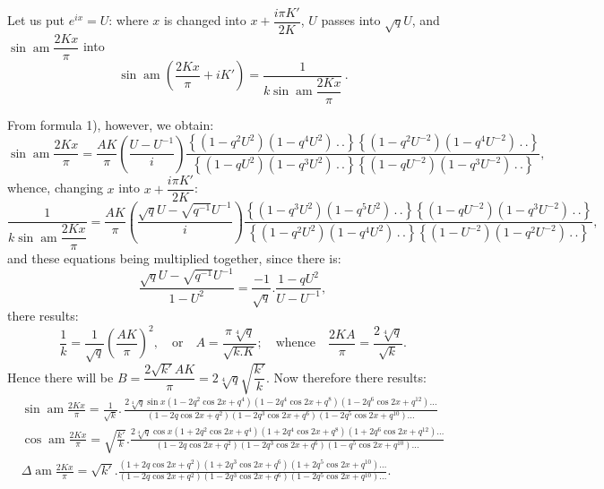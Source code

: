 \documentclass{article}
\begin{document}
Let us put $e^{ix}=U$: where $x$ is changed into $x+\dfrac{i\pi K'}{2K}$, $U$ passes into $\sqrt{q}U$, and $\sin\operatorname{am}\dfrac{2Kx}{\pi}$ into
\[
\sin\operatorname{am}\left(\frac{2Kx}{\pi}+iK'\right)=\frac{1}{k\sin\operatorname{am}\dfrac{2Kx}{\pi}}\,.
\]

From formula 1), however, we obtain:
\[
\sin\operatorname{am}\frac{2Kx}{\pi}=\frac{AK}{\pi}\left(\frac{U-U^{-1}}{i}\right)\frac{\left\{(1-q^{2}U^{2})(1-q^{4}U^{2})\,.\,.\right\}\left\{(1-q^{2}U^{-2})(1-q^{4}U^{-2})\,.\,.\right\}}{\left\{(1-qU^{2})(1-q^{3}U^{2})\,.\,.\right\}\left\{(1-qU^{-2})(1-q^{3}U^{-2})\,.\,.\right\}},
\]
whence, changing $x$ into $x+\dfrac{i\pi K'}{2K}$:
\[
\frac{1}{k\sin\operatorname{am}\dfrac{2Kx}{\pi}}=\frac{AK}{\pi}\left(\frac{\sqrt{q}U-\sqrt{q^{-1}}U^{-1}}{i}\right)\frac{\left\{(1-q^{3}U^{2})(1-q^{5}U^{2})\,.\,.\right\}\left\{(1-qU^{-2})(1-q^{3}U^{-2})\,.\,.\right\}}{\left\{(1-q^{2}U^{2})(1-q^{4}U^{2})\,.\,.\right\}\left\{(1-U^{-2})(1-q^{2}U^{-2})\,.\,.\right\}},
\]
and these equations being multiplied together, since there is:
\[
\frac{\sqrt{q}U-\sqrt{q^{-1}}U^{-1}}{1-U^{2}}=\frac{-1}{\sqrt{q}}.\frac{1-qU^{2}}{U-U^{-1}},
\]
there results:
\[
\frac{1}{k}=\frac{1}{\sqrt{q}}\left(\frac{AK}{\pi}\right)^{2},\quad\text{or}\quad A=\frac{\pi\sqrt[4]{q}}{\sqrt{k.K}};\quad\text{whence}\quad\frac{2KA}{\pi}=\frac{2\sqrt[4]{q}}{\sqrt{k}}.
\]
Hence there will be $B=\dfrac{2\sqrt{k'}AK}{\pi}=2\sqrt[4]{q}\sqrt{\dfrac{k'}{k}}$. Now therefore there results:
\[
\begin{gathered}
\sin\operatorname{am}\frac{2Kx}{\pi}=\frac{1}{\sqrt{k}}.\,\frac{2\sqrt[4]{q}\sin x(1-2q^{2}\cos 2x+q^{4})(1-2q^{4}\cos 2x+q^{8})(1-2q^{6}\cos 2x+q^{12})\ldots}{(1-2q\cos 2x+q^{2})(1-2q^{3}\cos 2x+q^{6})(1-2q^{5}\cos 2x+q^{10})\ldots}
\\[2ex]
\cos\operatorname{am}\frac{2Kx}{\pi}=\sqrt{\frac{k'}{k}}.\frac{2\sqrt[4]{q}\cos x(1+2q^{2}\cos 2x+q^{4})(1+2q^{4}\cos 2x+q^{8})(1+2q^{6}\cos 2x+q^{12})\ldots}{(1-2q\cos 2x+q^{2})(1-2q^{3}\cos 2x+q^{6})(1-q^{5}\cos 2x+q^{10})\ldots}
\\[2ex]
\Delta\operatorname{am}\frac{2Kx}{\pi}=\sqrt{k'}.\frac{(1+2q\cos 2x+q^{2})(1+2q^{3}\cos 2x+q^{6})(1+2q^{5}\cos 2x+q^{10})\ldots}{(1-2q\cos 2x+q^{2})(1-2q^{3}\cos 2x+q^{6})(1-2q^{5}\cos 2x+q^{10})\ldots}.
\end{gathered}
\]
\end{document}
